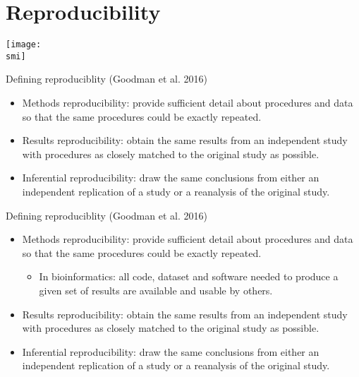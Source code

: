 \documentclass[10pt]{beamer}
\def\smi{out/ln/updir/mw-gcthesis-oral/library.bib}
\begin{document}
\section{Reproducibility}
\begin{frame}
  \def\smi{out/ln/updir/mw-gcthesis-oral/ink/reproducibility/pubmed_trend_reproducibility_crisis.pdf}
  \texttt{[image: \\smi]}%
\end{frame}
\begin{frame}{Defining reproduciblity}
  (Goodman et al. 2016)
  \begin{itemize}
    \item Methods reproducibility: provide sufficient detail about procedures and data so that the same procedures could be exactly repeated.
    \item Results reproducibility: obtain the same results from an independent study with procedures as closely matched to the original study as possible.
    \item Inferential reproducibility: draw the same conclusions from either an independent replication of a study or a reanalysis of the original study.
  \end{itemize}
\end{frame}
\begin{frame}{Defining reproduciblity}
  (Goodman et al. 2016)
  \begin{itemize}
    \item Methods reproducibility: provide sufficient detail about procedures and data so that the same procedures could be exactly repeated.
      \begin{itemize}
        \item In bioinformatics: all code, dataset and software needed to produce a given set of results are available and usable by others.
      \end{itemize}
    \item Results reproducibility: obtain the same results from an independent study with procedures as closely matched to the original study as possible.
    \item Inferential reproducibility: draw the same conclusions from either an independent replication of a study or a reanalysis of the original study.
  \end{itemize}
\end{frame}
\end{document}

